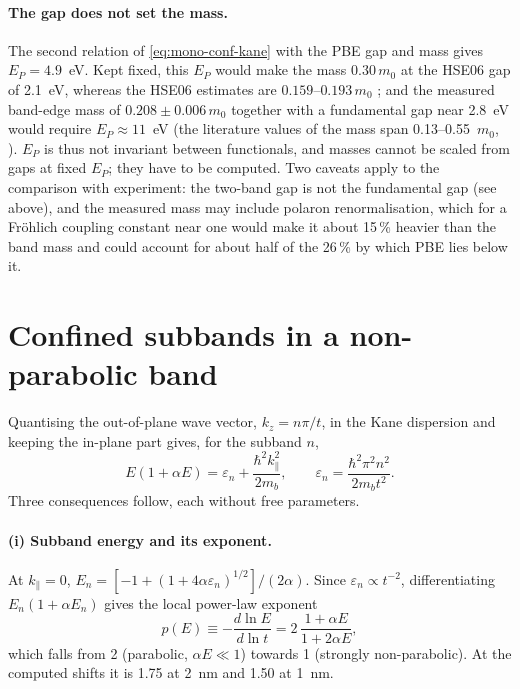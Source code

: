 \paragraph{The gap does not set the mass.} The second relation of \cref{eq:mono-conf-kane} with the PBE gap and mass
gives $E_P = 4.9$~eV. Kept fixed, this $E_P$ would make the mass $0.30\,m_0$ at the HSE06 gap of 2.1~eV, whereas the
HSE06 estimates are $0.159$--$0.193\,m_0$ ; and the measured band-edge mass of $0.208\pm0.006\,m_0$
\citep[p.~225102-1]{Stokey2021} together with a fundamental gap near 2.8~eV would require $E_P \approx 11$~eV (the
literature values of the mass span 0.13--0.55~$m_0$, \citealp[p.~225102-2]{Stokey2021}). $E_P$ is thus not invariant between functionals, and masses cannot be scaled from gaps at fixed $E_P$; they have to be
computed. Two caveats apply to the comparison with experiment: the two-band gap is not the fundamental gap (see above),
and the measured mass may include polaron renormalisation, which for a Fr\"ohlich coupling constant near one would make
it about 15\,\% heavier than the band mass and could account for about half of the 26\,\% by which PBE lies below it.

\section{Confined subbands in a non-parabolic band}
\label{sec:mono-conf-subband}

Quantising the out-of-plane wave vector, $k_z = n\pi/t$, in the Kane dispersion and keeping the in-plane part gives,
for the subband $n$,
\begin{equation}
E(1+\alpha E) = \varepsilon_n + \frac{\hbar^2k_\parallel^2}{2m_b},\qquad \varepsilon_n = \frac{\hbar^2\pi^2n^2}{2m_bt^2} .
\label{eq:mono-conf-sub}
\end{equation}
Three consequences follow, each without free parameters.

\paragraph{(i) Subband energy and its exponent.} At $k_\parallel = 0$, $E_n = [-1+(1+4\alpha\varepsilon_n)^{1/2}]/(2\alpha)$.
Since $\varepsilon_n \propto t^{-2}$, differentiating $E_n(1+\alpha E_n)$ gives the local power-law exponent
\begin{equation}
p(E) \equiv -\frac{d\ln E}{d\ln t} = 2\,\frac{1+\alpha E}{1+2\alpha E} ,
\label{eq:mono-conf-p}
\end{equation}
which falls from 2 (parabolic, $\alpha E \ll 1$) towards 1 (strongly non-parabolic). At the computed shifts it is 1.75
at 2~nm and 1.50 at 1~nm.

